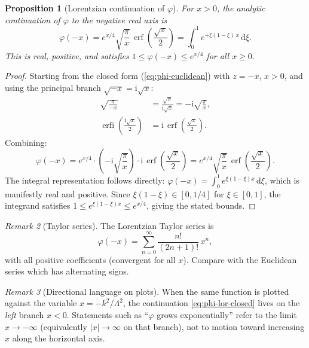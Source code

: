 \documentclass[11pt,a4paper]{article}
\newtheorem{proposition}{Proposition}[section]
\theoremstyle{definition}
\theoremstyle{remark}
\newtheorem{remark}[proposition]{Remark}
\newcommand{\dd}{\mathrm{d}}
\newcommand{\ii}{\mathrm{i}}
\newcommand{\erfi}{\operatorname{erfi}}
\newcommand{\erf}{\operatorname{erf}}
\begin{document}
\begin{proposition}[Lorentzian continuation of $\varphi$]
\label{prop:phi-lorentzian}
For $x > 0$, the analytic continuation of $\varphi$ to the negative
real axis is
\begin{equation}
  \label{eq:phi-lor-closed}
  \boxed{\varphi(-x) = e^{x/4}\sqrt{\frac{\pi}{x}}\,\erf\!\left(\frac{\sqrt{x}}{2}\right)
  = \int_0^1 e^{+\xi(1-\xi)\,x}\,\dd\xi.}
\end{equation}
This is real, positive, and satisfies $1 \leq \varphi(-x) \leq e^{x/4}$
for all $x \geq 0$.
\end{proposition}

\begin{proof}
Starting from the closed form (\ref{eq:phi-euclidean}) with $z = -x$,
$x > 0$, and using the principal branch $\sqrt{-x} = \ii\sqrt{x}$:
\begin{align}
  \sqrt{\frac{\pi}{-x}} &= \frac{\sqrt{\pi}}{\ii\sqrt{x}}
    = -\ii\sqrt{\frac{\pi}{x}},\\[3pt]
  \erfi\!\left(\frac{\ii\sqrt{x}}{2}\right)
    &= \ii\,\erf\!\left(\frac{\sqrt{x}}{2}\right).
\end{align}
Combining:
\begin{equation}
  \varphi(-x) = e^{x/4}\cdot\left(-\ii\sqrt{\frac{\pi}{x}}\right)
  \cdot \ii\,\erf\!\left(\frac{\sqrt{x}}{2}\right)
  = e^{x/4}\sqrt{\frac{\pi}{x}}\,\erf\!\left(\frac{\sqrt{x}}{2}\right).
\end{equation}
The integral representation follows directly:
$\varphi(-x) = \int_0^1 e^{\xi(1-\xi)x}\,\dd\xi$, which is manifestly
real and positive.  Since $\xi(1-\xi) \in [0, 1/4]$ for
$\xi \in [0,1]$, the integrand satisfies $1 \leq e^{\xi(1-\xi)x} \leq
e^{x/4}$, giving the stated bounds.
\end{proof}

\begin{remark}[Taylor series]
The Lorentzian Taylor series is
\begin{equation}
  \label{eq:phi-lor-taylor}
  \varphi(-x) = \sum_{n=0}^{\infty} \frac{n!}{(2n+1)!}\,x^n,
\end{equation}
with all positive coefficients (convergent for all $x$).  Compare with
the Euclidean series which has alternating signs.
\end{remark}

\begin{remark}[Directional language on plots]
When the same function is plotted against the variable $x = -k^2/\Lambda^2$,
the continuation \eqref{eq:phi-lor-closed} lives on the \emph{left} branch
$x < 0$.  Statements such as ``$\varphi$ grows exponentially'' refer to the
limit $x \to -\infty$ (equivalently $|x| \to \infty$ on that branch), not to
motion toward increasing $x$ along the horizontal axis.
\end{remark}
\end{document}
